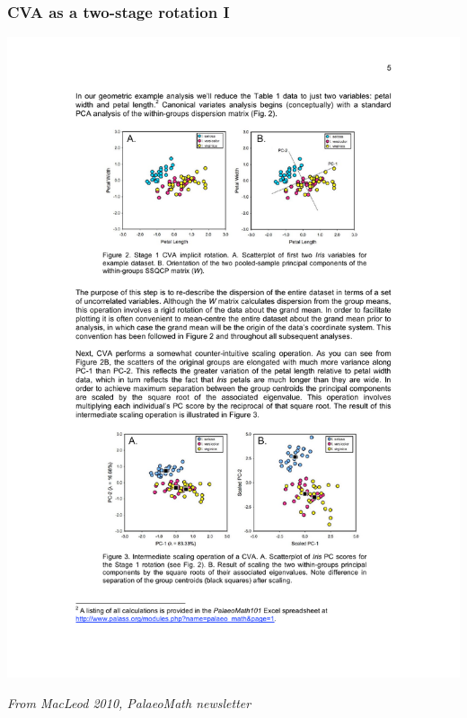 \documentclass{beamer}
\begin{document}
\begin{frame}
  \frametitle{CVA as a two-stage rotation I}

\begin{center}
\includegraphics[width=\textwidth]{cva-as-rot1}
\end{center}

\hfill {\scriptsize \textit{From MacLeod 2010, PalaeoMath newsletter}}

\end{frame}
\end{document}
